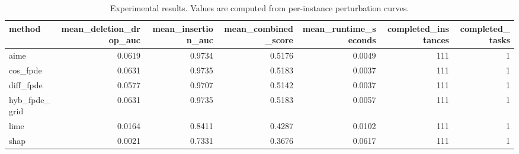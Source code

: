 \begin{table}[t]
\caption{Experimental results. Values are computed from per-instance perturbation curves.}
\label{tab:main_results_computed}
\centering
\begin{tabular}{lrrrrrr}
\toprule
method & mean\_deletion\_drop\_auc & mean\_insertion\_auc & mean\_combined\_score & mean\_runtime\_seconds & completed\_instances & completed\_tasks \\
\midrule
aime & 0.0619 & 0.9734 & 0.5176 & 0.0049 & 111 & 1 \\
cos\_fpde & 0.0631 & 0.9735 & 0.5183 & 0.0037 & 111 & 1 \\
diff\_fpde & 0.0577 & 0.9707 & 0.5142 & 0.0037 & 111 & 1 \\
hyb\_fpde\_grid & 0.0631 & 0.9735 & 0.5183 & 0.0057 & 111 & 1 \\
lime & 0.0164 & 0.8411 & 0.4287 & 0.0102 & 111 & 1 \\
shap & 0.0021 & 0.7331 & 0.3676 & 0.0617 & 111 & 1 \\
\bottomrule
\end{tabular}

\end{table}
